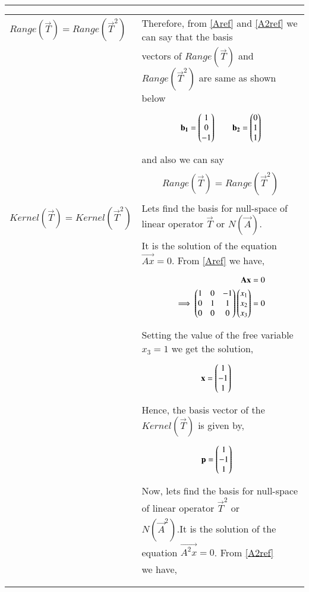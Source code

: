 \documentclass[journal,12pt]{IEEEtran}
\begin{document}
\begin{longtable}{|l|l|}
{\begin{align}
\end{align}}\\
\hline $Range(\vec{T})=Range(\vec{T}^2)$&Therefore, from \eqref{Aref} and \eqref{A2ref} we can say that the basis\\&vectors of $Range(\vec{T})$ and $Range(\vec{T}^2)$ are same as shown below\\&\parbox{11cm}{\begin{align}
    \mathbf{b_1}=\begin{pmatrix}1\\0\\-1\end{pmatrix}\quad\quad\mathbf{b_2}=\begin{pmatrix}0\\1\\1\end{pmatrix}\label{basis}
\end{align}}\\&and also we can say\\&\parbox{11cm}{\begin{align}
    Range(\vec{T})=Range(\vec{T}^2)\label{exp1}
\end{align}}\\
\hline
$Kernel(\vec{T})=Kernel(\vec{T}^2)$&Lets find the basis for null-space of linear operator $\vec{T}$ or $N(\vec{A})$.\\&It is the solution of the equation $\vec{Ax}=0$. From \eqref{Aref} we have,\\&\parbox{11cm}{\begin{align}
\mathbf{Ax} &= 0\\
\implies\begin{pmatrix}1&0&-1\\0&1&1\\0&0&0\end{pmatrix}\begin{pmatrix}x_1\\x_2\\x_3\end{pmatrix} &= 0
\end{align}}\\&Setting the value of the free variable $x_3 = 1$ we get the solution,\\&\parbox{11cm}{
\begin{align}
\mathbf{x} &= \begin{pmatrix}1\\-1\\1\end{pmatrix}
\end{align}}\\&Hence, the basis vector of the $Kernel(\vec{T})$ is given by,\\&\parbox{11cm}{
\begin{align}
\mathbf{p} &= \begin{pmatrix}1\\-1\\1\end{pmatrix}\label{bp1}
\end{align}}\\&Now, lets find the basis for null-space of linear operator $\vec{T}^2$ or\\&$N(\vec{A}^2)$.It is the solution of the equation $\vec{A^2x}=0$. From \eqref{A2ref}\\&we have,\\&\parbox{11cm}{\begin{align}

\end{align}}
\end{longtable}
\end{document}
